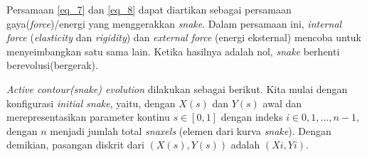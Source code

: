 Persamaan \ref{eq_7} dan \ref{eq_8} dapat diartikan sebagai persamaan gaya(\emph{force})/energi yang menggerakkan \emph{snake}. Dalam persamaan ini, \emph{internal force} (\emph{elasticity} dan \emph{rigidity}) dan \emph{external force} (energi eksternal) mencoba untuk menyeimbangkan satu sama lain. Ketika hasilnya adalah nol, \emph{snake} berhenti berevolusi(bergerak)\citep{acton2007biomedical:19}.

\emph{Active contour(snake) evolution} dilakukan sebagai berikut. Kita mulai dengan konfigurasi \emph{initial snake}, yaitu, dengan $X(s)$ dan $Y(s)$ awal dan merepresentasikan parameter kontinu $ s \in [0, 1] $ dengan indeks $ i \in {0, 1,…, n - 1} $, dengan $n$ menjadi jumlah total \emph{snaxels} (elemen dari kurva \emph{snake}). Dengan demikian, pasangan diskrit dari $(X (s), Y (s))$ adalah $(Xi, Yi)$.

